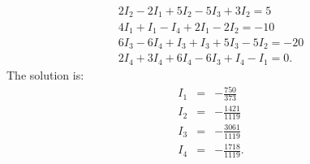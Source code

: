 \begin{ex}
\begin{sol}
\begin{equation*}
      \begin{array}{c}
        2I_{2}-2I_{1}+5I_{2}-5I_{3}+3I_{2}=5 \\
        4I_{1}+I_{1}-I_{4}+2I_{1}-2I_{2}=-10 \\
        6I_{3}-6I_{4}+I_{3}+I_{3}+5I_{3}-5I_{2}=-20 \\
        2I_{4}+3I_{4}+6I_{4}-6I_{3}+I_{4}-I_{1}=0.
      \end{array}
    \end{equation*}
    The solution is:
    \begin{eqnarray*}
      I_{1}&=& -\frac{750}{373} \\
      I_{2}&=& -\frac{1421}{1119} \\
      I_{3}&=& -\frac{3061}{1119} \\
      I_{4}&=& -\frac{1718}{1119}.
    \end{eqnarray*}
  \end{sol}
\end{ex}

